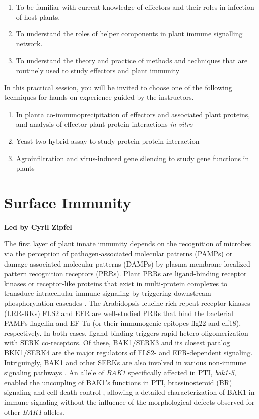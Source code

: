 \documentclass[12pt,]{book}
\providecommand{\tightlist}{%
  \setlength{\itemsep}{0pt}\setlength{\parskip}{0pt}}
\theoremstyle{definition}
\theoremstyle{definition}
\theoremstyle{remark}
\begin{document}
\begin{enumerate}
\def\labelenumi{\arabic{enumi}.}
\tightlist
\item
  To be familiar with current knowledge of effectors and their roles in
  infection of host plants.
\item
  To understand the roles of helper components in plant immune
  signalling network.
\item
  To understand the theory and practice of methods and techniques that
  are routinely used to study effectors and plant immunity
\end{enumerate}

In this practical session, you will be invited to choose one of the
following techniques for hands-on experience guided by the instructors.

\begin{enumerate}
\def\labelenumi{\arabic{enumi}.}
\tightlist
\item
  In planta co-immunoprecipitation of effectors and associated plant
  proteins, and analysis of effector-plant protein interactions \emph{in
  vitro}
\item
  Yeast two-hybrid assay to study protein-protein interaction
\item
  Agroinfiltration and virus-induced gene silencing to study gene
  functions in plants
\end{enumerate}

\chapter*{Surface Immunity}\label{surface-immunity}

\textbf{Led by Cyril Zipfel}

The first layer of plant innate immunity depends on the recognition of
microbes via the perception of pathogen-associated molecular patterns
(PAMPs) or damage-associated molecular patterns (DAMPs) by plasma
membrane-localized pattern recognition receptors (PRRs). Plant PRRs are
ligand-binding receptor kinases or receptor-like proteins that exist in
multi-protein complexes to transduce intracellular immune signaling by
triggering downstream phosphorylation cascades \citep{Couto:2016kq}. The
Arabidopsis leucine-rich repeat receptor kinases (LRR-RKs) FLS2 and EFR
are well-studied PRRs that bind the bacterial PAMPs flagellin and EF-Tu
(or their immunogenic epitopes flg22 and elf18), respectively. In both
cases, ligand-binding triggers rapid hetero-oligomerization with SERK
co-receptors. Of these, BAK1/SERK3 and its closest paralog BKK1/SERK4
are the major regulators of FLS2- and EFR-dependent signaling.
Intriguingly, BAK1 and other SERKs are also involved in various
non-immune signaling pathways \citep{Ma:2016eu}. An allele of
\emph{BAK1} specifically affected in PTI, \emph{bak1-5}, enabled the
uncoupling of BAK1's functions in PTI, brassinosteroid (BR) signaling
and cell death control \citep{Schwessinger:2011ku}, allowing a detailed
characterization of BAK1 in immune signaling without the influence of
the morphological defects observed for other \emph{BAK1} alleles.
\end{document}

